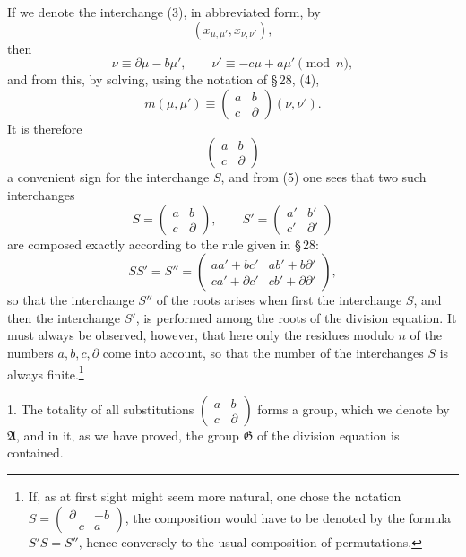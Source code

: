 \documentclass[11pt]{article}
\begin{document}
If we denote the interchange (3), in abbreviated form, by
\[
 (x_{\mu,\mu'},x_{\nu,\nu'}),
\]
then
\[
 \nu\equiv\partial\mu-b\mu',
 \qquad \nu'\equiv-c\mu+a\mu'\pmod n,
\]
and from this, by solving, using the notation of \S\,28, (4),
\begin{equation}
 m(\mu,\mu')\equiv
 \begin{pmatrix}a&b\\ c&\partial\end{pmatrix}(\nu,\nu').
\tag{5}
\end{equation}
It is therefore
\begin{equation}
 \begin{pmatrix}a&b\\ c&\partial\end{pmatrix}
\tag{6}
\end{equation}
a convenient sign for the interchange $S$, and from (5) one sees that two such
interchanges
\[
 S=\begin{pmatrix}a&b\\ c&\partial\end{pmatrix},\qquad
 S'=\begin{pmatrix}a'&b'\\ c'&\partial'\end{pmatrix}
\]
are composed exactly according to the rule given in \S\,28:
\begin{equation}
 SS'=S''=
 \begin{pmatrix}
 aa'+bc'&ab'+b\partial'\\
 ca'+\partial c'&cb'+\partial\partial'
 \end{pmatrix},
\tag{7}
\end{equation}
so that the interchange $S''$ of the roots arises when first the interchange $S$, and then
the interchange $S'$, is performed among the roots of the division equation. It must always
be observed, however, that here only the residues modulo $n$ of the numbers
$a,b,c,\partial$ come into account, so that the number of the interchanges $S$ is always finite.\footnote{If, as at first sight might seem more natural, one chose the notation
$S=\begin{pmatrix}\partial&-b\\ -c&a\end{pmatrix}$, the composition would have to be denoted by the formula
$S'S=S''$, hence conversely to the usual composition of permutations.}

1. The totality of all substitutions $\begin{pmatrix}a&b\\ c&\partial\end{pmatrix}$ forms a
group, which we denote by $\mathfrak A$, and in it, as we have proved, the group
$\mathfrak G$ of the division equation is contained.
\end{document}
